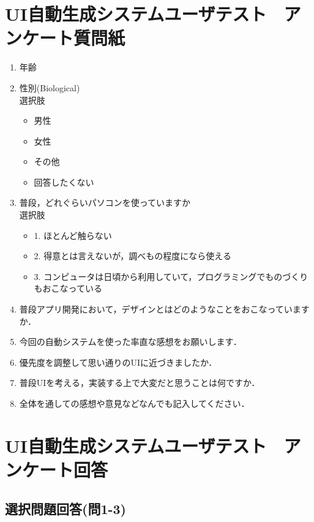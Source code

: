 \chapter{UI自動生成システムユーザテスト　アンケート質問紙}
\begin{enumerate}
  \item 年齢
  \item 性別(Biological)
  \\選択肢
 \begin{itemize}
  \item 男性
  \item 女性
  \item その他
  \item 回答したくない
\end{itemize}
\item 普段，どれぐらいパソコンを使っていますか
\\選択肢
\begin{itemize}
	\item 1. ほとんど触らない
	\item 2. 得意とは言えないが，調べもの程度になら使える
	\item 3. コンピュータは日頃から利用していて，プログラミングでものづくりもおこなっている
\end{itemize}
\item 普段アプリ開発において，デザインとはどのようなことをおこなっていますか．
\item 今回の自動システムを使った率直な感想をお願いします．
\item 優先度を調整して思い通りのUIに近づきましたか．
\item 普段UIを考える，実装する上で大変だと思うことは何ですか．
\item 全体を通しての感想や意見などなんでも記入してください．
\end{enumerate}

\chapter{UI自動生成システムユーザテスト　アンケート回答}
\section{選択問題回答(問1-3)}
\begin{table}[htbp]
\centering
{}
\caption{各要素の配置係数}
\label{table:viewArrangementRatio}
\end{table}



